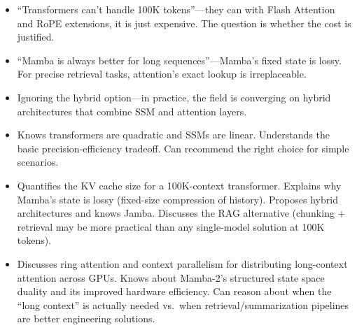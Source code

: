 \begin{interviewq}
\redflags
\begin{itemize}
    \item ``Transformers can't handle 100K tokens''---they can with Flash Attention and RoPE extensions, it is just expensive. The question is whether the cost is justified.
    \item ``Mamba is always better for long sequences''---Mamba's fixed state is lossy. For precise retrieval tasks, attention's exact lookup is irreplaceable.
    \item Ignoring the hybrid option---in practice, the field is converging on hybrid architectures that combine SSM and attention layers.
\end{itemize}


\goodgreat
\begin{itemize}
    \item {} Knows transformers are quadratic and SSMs are linear. Understands the basic precision-efficiency tradeoff. Can recommend the right choice for simple scenarios.
    \item {} Quantifies the KV cache size for a 100K-context transformer. Explains why Mamba's state is lossy (fixed-size compression of history). Proposes hybrid architectures and knows Jamba. Discusses the RAG alternative (chunking + retrieval may be more practical than any single-model solution at 100K tokens).
    \item {} Discusses ring attention and context parallelism for distributing long-context attention across GPUs. Knows about Mamba-2's structured state space duality and its improved hardware efficiency. Can reason about when the ``long context'' is actually needed vs.\ when retrieval/summarization pipelines are better engineering solutions.
\end{itemize}

\end{interviewq}

